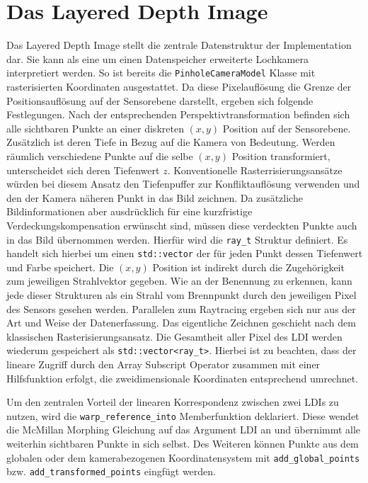 \documentclass[hyperref, beleg, german]{cgvpub}
\begin{document}
\section{Das Layered Depth Image}

Das Layered Depth Image stellt die zentrale Datenstruktur der Implementation
dar. Sie kann als eine um einen Datenspeicher erweiterte Lochkamera
interpretiert werden. So ist bereits die \texttt{PinholeCameraModel} Klasse mit
rasterisierten Koordinaten ausgestattet. Da diese Pixelauflösung die Grenze der
Positionsauflösung auf der Sensorebene darstellt, ergeben sich folgende
Festlegungen. Nach der entsprechenden Perspektivtransformation befinden sich
alle sichtbaren Punkte an einer diskreten \( (x, y) \) Position auf der
Sensorebene. Zusätzlich ist deren Tiefe in Bezug auf die Kamera von Bedeutung.
Werden räumlich verschiedene Punkte auf die selbe \( (x,y) \) Position
transformiert, unterscheidet sich deren Tiefenwert \(z\). Konventionelle
Rasterrisierungsansätze würden bei diesem Ansatz den Tiefenpuffer zur
Konfliktauflösung verwenden und den der Kamera näheren Punkt in das Bild
zeichnen. Da zusätzliche Bildinformationen aber ausdrücklich für eine
kurzfristige Verdeckungskompensation erwünscht sind, müssen diese verdeckten
Punkte auch in das Bild übernommen werden. Hierfür wird die \texttt{ray\_t}
Struktur definiert. Es handelt sich hierbei um einen \texttt{std::vector} der
für jeden Punkt dessen Tiefenwert und Farbe speichert. Die \( (x,y) \) Position
ist indirekt durch die Zugehörigkeit zum jeweiligen Strahlvektor gegeben. Wie
an der Benennung zu erkennen, kann jede dieser Strukturen als ein Strahl vom
Brennpunkt durch den jeweiligen Pixel des Sensors gesehen werden. Parallelen
zum Raytracing ergeben sich nur aus der Art und Weise der Datenerfassung. Das
eigentliche Zeichnen geschieht nach dem klassischen Rasterisierungsansatz. Die
Gesamtheit aller Pixel des LDI werden wiederum gespeichert als
\texttt{std::vector<ray\_t>}. Hierbei ist zu beachten, dass der lineare Zugriff
durch den Array Subscript Operator zusammen mit einer Hilfsfunktion erfolgt,
die zweidimensionale Koordinaten entsprechend umrechnet.

Um den zentralen Vorteil der linearen Korrespondenz zwischen zwei LDIs zu
nutzen, wird die \texttt{warp\_reference\_into} Memberfunktion deklariert.
Diese wendet die McMillan Morphing Gleichung auf das Argument LDI an und
übernimmt alle weiterhin sichtbaren Punkte in sich selbst. Des Weiteren können
Punkte aus dem globalen oder dem kamerabezogenen Koordinatensystem mit
\texttt{add\_global\_points} bzw. \texttt{add\_transformed\_points} eingfügt
werden.
\end{document}
